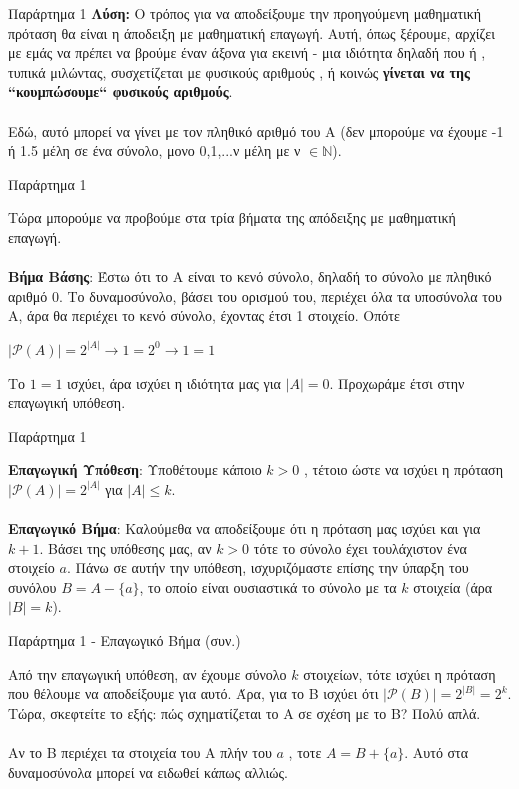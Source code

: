 \documentclass[size=14pt, paper=smartboard, style=fyma, mode=present]{powerdot}
\begin{document}
\begin{slide}[toc=]{Παράρτημα 1}
{\Large 	\textbf{Λύση:} Ο τρόπος για να αποδείξουμε την προηγούμενη μαθηματική πρόταση θα είναι η άποδειξη με μαθηματική επαγωγή. Αυτή, όπως ξέρουμε, αρχίζει με εμάς να πρέπει να βρούμε έναν άξονα για εκεινή - μια ιδιότητα δηλαδή που ή , τυπικά μιλώντας, συσχετίζεται με φυσικούς αριθμούς , ή κοινώς \textbf{γίνεται να της ``κουμπώσουμε`` φυσικούς αριθμούς}. \\~\\
	Εδώ, αυτό μπορεί να γίνει με τον πληθικό αριθμό του Α (δεν μπορούμε να έχουμε -1 ή 1.5 μέλη σε ένα σύνολο, μονο 0,1,...ν μέλη με ν $\in \mathbb{N}$).}
\end{slide}
\begin{slide}[toc=]{Παράρτημα 1}
{\Large	

	Τώρα μπορούμε να προβούμε στα τρία βήματα της απόδειξης με μαθηματική επαγωγή. \\~\\
	\textbf{Βήμα Βάσης}: Έστω ότι το Α είναι το κενό σύνολο, δηλαδή το σύνολο με πληθικό αριθμό 0. Το δυναμοσύνολο, βάσει του ορισμού του, περιέχει όλα τα υποσύνολα του Α, άρα θα περιέχει το κενό σύνολο, έχοντας έτσι 1 στοιχείο. Οπότε
	\begin{center}
		$|\mathcal{P}(A)|=2^{|A|} \to 1 = 2^0 \to 1 =1$
	\end{center}
	Το $1=1$ ισχύει, άρα ισχύει η ιδιότητα μας για $|Α|=0$. Προχωράμε έτσι στην επαγωγική υπόθεση.
	
}
\end{slide}
\begin{slide}[toc=]{Παράρτημα 1}
	{\Large	
		\textbf{Επαγωγική Υπόθεση}: Υποθέτουμε κάποιο $k > 0$ , τέτοιο ώστε να ισχύει η πρόταση $|\mathcal{P}(A)|=2^{|A|}$ για $|Α| \le k$.
		\\~\\
		\textbf{Επαγωγικό Βήμα}: Καλούμεθα να αποδείξουμε ότι η πρόταση μας ισχύει και για $k+1$. Βάσει της υπόθεσης μας, αν $k>0$ τότε το σύνολο έχει τουλάχιστον ένα στοιχείο $a$. Πάνω σε αυτήν την υπόθεση, ισχυριζόμαστε επίσης την ύπαρξη του συνόλου $B = A - \{a\}$, το οποίο είναι ουσιαστικά το σύνολο με τα $k$ στοιχεία (άρα $|B|=k$).
		
		
	}
\end{slide}
\begin{slide}[toc=]{Παράρτημα 1 - Επαγωγικό Βήμα (συν.)}
	{\Large	
		Από την επαγωγική υπόθεση, αν έχουμε σύνολο $k$ στοιχείων, τότε ισχύει η πρόταση που θέλουμε να αποδείξουμε για αυτό. Άρα, για το Β ισχύει ότι $|\mathcal{P}(B)|=2^{|B|}=2^k$. \\
			\pause 
		Τώρα, σκεφτείτε το εξής: πώς σχηματίζεται το Α σε σχέση με το Β? 
		Πολύ απλά. \\~\\
		
		Αν το Β περιέχει τα στοιχεία του Α πλήν του $a$ , τοτε $Α = Β + \{a\}$. Αυτό στα δυναμοσύνολα μπορεί να ειδωθεί κάπως αλλιώς.
		
		
	}
\end{slide}
\end{document}
